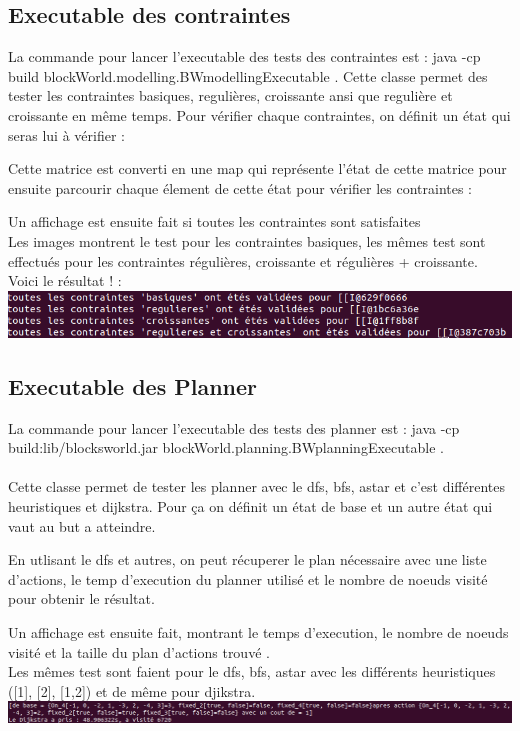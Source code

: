 \documentclass[12pt]{article}
\begin{document}
		\subsection{Executable des contraintes}
			La commande pour lancer l'executable des tests des contraintes est : java -cp build blockWorld.modelling.BWmodellingExecutable .
			Cette classe permet des tester les contraintes basiques, regulières, croissante ansi que regulière et croissante en même temps. Pour vérifier chaque contraintes, on définit un état qui seras lui à vérifier :
			
			Cette matrice est converti en une map qui représente l'état de cette matrice pour ensuite parcourir chaque élement de cette état pour vérifier les contraintes :
			 
			 Un affichage est ensuite fait si toutes les contraintes sont satisfaites\\
			 Les images montrent le test pour les contraintes basiques, les mêmes test sont effectués pour les contraintes régulières, croissante et régulières + croissante.\\Voici le résultat ! :\\
			 \includegraphics[width=1\textwidth]{image/resContraintes.png}
			 
		\subsection{Executable des Planner}
			La commande pour lancer l'executable des tests des planner est : java -cp build:lib/blocksworld.jar blockWorld.planning.BWplanningExecutable .\\\\
			Cette classe permet de tester les planner avec le dfs, bfs, astar et c'est différentes heuristiques et dijkstra. Pour ça on définit un état de base et un autre état qui vaut au but a atteindre.
			
			En utlisant le dfs et autres, on peut récuperer le plan nécessaire avec une liste d'actions, le temp d'execution du planner utilisé et le nombre de noeuds visité pour obtenir le résultat.
			
			Un affichage est ensuite fait, montrant le temps d'execution, le nombre de noeuds visité et la taille du plan d'actions trouvé .\\
			Les mêmes test sont faient pour le dfs, bfs, astar avec les différents heuristiques ([1], [2], [1,2]) et de même pour djikstra.\\
			\includegraphics[width=1\textwidth]{image/resPlanning.png}
			
\end{document}
